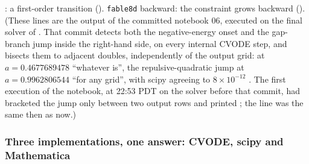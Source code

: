 : a first-order transition (). \texttt{fable8d} backward: the constraint grows
backward (). (These lines are the output of the committed notebook 06, executed on the final solver of
. That commit detects both the negative-energy onset and the gap-branch jump inside the
right-hand side, on every internal CVODE step, and bisects them to adjacent doubles, independently of the
output grid:  at $a=0.4677689478$ ``whatever  is'', the
repulsive-quadratic jump at $a=0.9962806544$ ``for any grid'', with scipy agreeing to $8\times10^{-12}$
. The first execution of the notebook, at 22:53 PDT on the solver before that
commit, had bracketed the jump only between two output rows and printed
;
the  line was the same then as now.)

\subsubsection{Three implementations, one answer: CVODE, scipy and Mathematica}
\label{sec:4.7.12}

